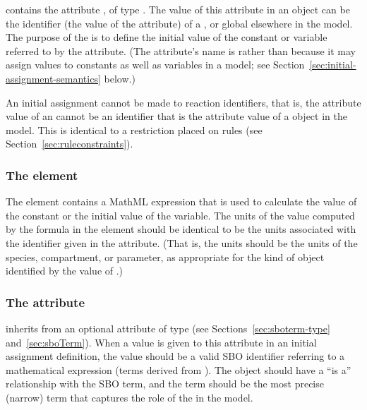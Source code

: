 \InitialAssignment contains the attribute
, of type .  The value of this
attribute in an \InitialAssignment object can be the
identifier (\ie the value of the  attribute)
of a \Compartment, \Species or global \Parameter elsewhere in the
model.  The purpose of the \InitialAssignment is to define the
initial value of the constant or variable referred to by the
 attribute.  (The attribute's
name is  rather than  because it may
assign values to constants as well as variables in a model; see
Section~\ref{sec:initial-assignment-semantics} below.)

An initial assignment cannot be made to reaction identifiers, that
is, the  attribute value of an \InitialAssignment cannot
be an identifier that is the  attribute value of a \Reaction
object in the model.  This is identical to a restriction placed on
rules (see Section~\ref{sec:ruleconstraints}).


\subsubsection{The  element}

The  element contains a MathML expression that is used
to calculate the value of the constant or the initial value of the
variable.  The units of the value computed by the formula in the
 element should be identical to be the units associated with the
identifier given in the  attribute.  (That is, the units
should be the units of the species, compartment, or parameter, as
appropriate for the kind of object identified by the value of
.)


\subsubsection{The  attribute}
\label{sec:initialassignment-sboterm}

\InitialAssignment inherits from \SBase an optional  attribute of type
 (see Sections~\ref{sec:sboterm-type}
and~\ref{sec:sboTerm}).  When a value is given to this attribute in an
initial assignment definition, the value should be a valid SBO
identifier referring to a mathematical expression (\ie terms
derived from \sbomathformula).  The \InitialAssignment object
should have a ``is a'' relationship with the SBO term, and the
term should be the most precise (narrow) term that captures the
role of the \InitialAssignment in the model.

